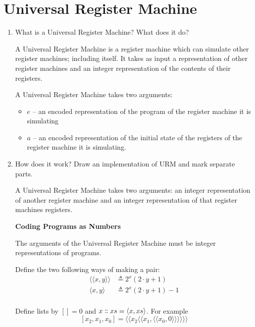 \documentclass[10pt,\jkfside,a4paper]{article}
\begin{document}
\section{Universal Register Machine}

\begin{enumerate}[label=(\alph*)]

\item What is a Universal Register Machine? What does it do?

A Universal Register Machine is a register machine which can simulate other
register machines; including itself. It takes as input a representation of
other register machines and an integer representation of the contents of
their registers.

A Universal Register Machine takes two arguments:

\begin{itemize}

\item $e$ -- an encoded representation of the program of the register
machine it is simulating

\item $a$ -- an encoded representation of the initial state of the registers
of the register machine it is simulating.

\end{itemize}

\item How does it work? Draw an implementation of URM and mark separate parts.

A Universal Register Machine takes two arguments: an integer representation
of another register machine and an integer representation of that register
machines registers.

\textbf{Coding Programs as Numbers}

The arguments of the Universal Register Machine must be integer
representations of programs.

Define the two following ways of making a pair:
\begin{align}
\langle\langle x, y \rangle \rangle &\triangleq 2^x\left(2 \cdot y +
1\right) \\
\langle x, y \rangle &\triangleq 2^x\left(2 \cdot y +
1\right) - 1 \\
\end{align}

Define lists by $[] = 0$ and $x \dblcolon xs = \langle x, xs \rangle $.
For example
\[
[x_2, x_1, x_0] = \langle \langle x_2 \langle \langle x_1, \langle
\langle x_0, 0 \rangle
\rangle \rangle \rangle \rangle \rangle
\]


\end{enumerate}
\end{document}
